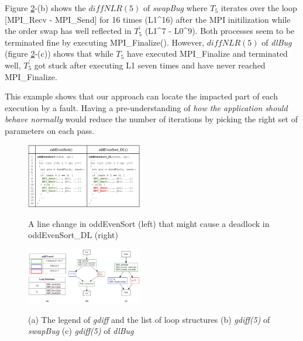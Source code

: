 Figure \ref{fig.gdiffs}-(b) shows the $diffNLR(5)$ of \textit{swapBug} where $T_5$ iterates over the loop [MPI\_Recv - MPI\_Send] for 16 times (L1\^{}16) after the MPI initilization while the order swap has well reflected in $T_5^\prime$ (L1\^{}7 - L0\^{}9). Both processes seem to be terminated fine by executing MPI\_Finalize(). 
However, $diffNLR(5)$ of \textit{dlBug} (figure \ref{fig.gdiffs}-(c)) shows that while $T_5$ have executed MPI\_Finalize and terminated well, $T_5^\prime$ got stuck after executing L1 seven times and have never reached MPI\_Finalize.

This example shows that our approach can locate the impacted part of each execution by a fault. Having a pre-understanding of \textit{how the application should behave normally} would reduce the number of iterations by picking the right set of parameters on each pass. 


\begin{figure}[]
\centering
\caption{A line change in oddEvenSort (left) that might cause a deadlock in oddEvenSort\_DL (right)}
\includegraphics[width=0.45\textwidth]{figs/oddEvenDL.png}
\label{fig.oddEvenDL}
\end{figure}


\begin{figure}[]
\centering
\caption{(a) The legend of \textit{gdiff} and the list of loop structures (b) \textit{gdiff(5)} of \textit{swapBug} (c) \textit{gdiff(5)} of \textit{dlBug}}
\includegraphics[width=0.45\textwidth]{figs/sampleGdiff.png}
\label{fig.gdiffs}
\end{figure}





%
